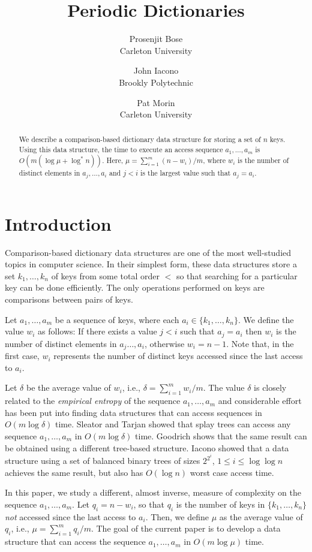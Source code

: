 \documentclass[lotsofwhite,ccfonts]{patmorin}
\title{Periodic Dictionaries}
\author{Prosenjit Bose \\ Carleton University \and
	John Iacono \\ Brookly Polytechnic \and
	Pat Morin \\ Carleton University}
\date{}
\begin{document}
\maketitle
\begin{abstract}
We describe a comparison-based dictionary data structure for storing a
set of $n$ keys.  Using this data structure, the time to execute an
access sequence $a_1,\ldots,a_m$ is $O(m(\log\mu+\log^* n))$.  Here,
$\mu=\sum_{i=1}^m (n-w_i)/m$, where $w_i$ is the number of distinct
elements in $a_j,\ldots,a_i$ and $j<i$ is the largest value such that
$a_j=a_i$.
\end{abstract}

\section{Introduction}

Comparison-based dictionary data structures are one of the most
well-studied topics in computer science.  In their simplest form,
these data structures store a set $k_1,\ldots,k_n$ of keys from some
total order $<$ so that searching for a particular key can be done
efficiently.  The only operations performed on keys are comparisons
between pairs of keys.

Let $a_1,\ldots,a_m$ be a sequence of keys, where each
$a_i\in\{k_1,\ldots,k_n\}$.  We define the value $w_i$ as follows: If
there exists a value $j<i$ such that $a_j=a_i$ then $w_i$ is the
number of distinct elements in $a_j\ldots,a_i$, otherwise $w_i=n-1$.
Note that, in the first case, $w_i$ represents the number of distinct
keys accessed since the last access to $a_i$.

Let $\delta$ be the average value of $w_i$, i.e., $\delta=\sum_{i=1}^m
w_i/m$.  The value $\delta$ is closely related to the \emph{empirical
entropy} of the sequence $a_1,\ldots,a_m$ and considerable effort has
been put into finding data structures that can access sequences in
$O(m\log\delta)$ time.  Sleator and Tarjan \cite{st85} showed that
splay trees can access any sequence $a_1,\ldots,a_m$ in
$O(m\log\delta)$ time.  Goodrich \cite{g00} shows that the same result
can be obtained using a different tree-based structure.  Iacono
\cite{i01} showed that a data structure using a set of balanced binary
trees of sizes $2^{2^i}$, $1\le i\le \log\log n$ achieves the same
result, but also has $O(\log n)$ worst case access time.

In this paper, we study a different, almost inverse, measure of
complexity on the sequence $a_1,\ldots,a_m$.  Let $q_i=n-w_i$, so that
$q_i$ is the number of keys in $\{k_1,\ldots,k_n\}$ \emph{not}
accessed since the last access to $a_i$.  Then, we define $\mu$ as the
average value of $q_i$, i.e., $\mu=\sum_{i=1}^m q_i/m$.  The goal of
the current paper is to develop a data structure that can access the
sequence $a_1,\ldots,a_m$ in $O(m\log\mu)$ time.
\end{document}
